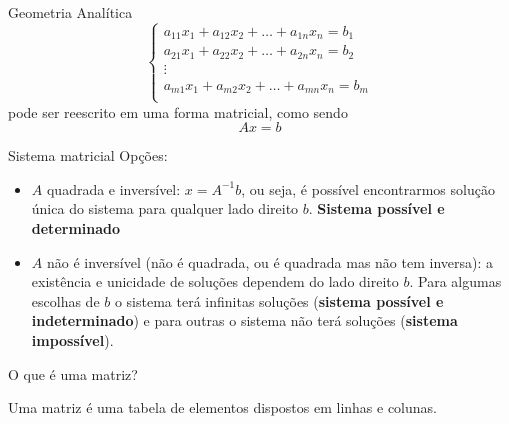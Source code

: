 \documentclass{beamer}
\begin{document}
\begin{darkframes}
\begin{frame}{Geometria Analítica}
\begin{equation*}
  \begin{cases}
 a_{11}x_1+a_{12}x_2+\ldots +a_{1n}x_n=b_1\\
 a_{21}x_1+a_{22}x_2+\ldots +a_{2n}x_n=b_2\\
 \vdots\\
 a_{m1}x_1+a_{m2}x_2+\ldots +a_{mn}x_n=b_m\\
  \end{cases}
\end{equation*}
pode ser reescrito em uma forma matricial, como sendo
\begin{equation*}
  Ax=b
\end{equation*}
\end{frame}

\begin{frame}{Sistema matricial}
Opções:
\begin{itemize}
  \item<2-> $A$ quadrada e inversível: $x=A^{-1}b$, ou seja, é possível encontrarmos solução única do sistema para qualquer lado direito $b$. \textbf{Sistema possível e determinado}
  \item<3-> $A$ não é inversível (não é quadrada, ou é quadrada mas não tem inversa): a existência e unicidade de soluções dependem do lado direito $b$. Para algumas escolhas de $b$ o sistema terá infinitas soluções (\textbf{sistema possível e indeterminado}) e para outras o sistema não terá soluções (\textbf{sistema impossível}). 
\end{itemize}
\end{frame}

\begin{frame}{O que é uma matriz?}
\begin{block}{}
     Uma matriz é uma tabela de elementos dispostos em linhas e colunas.
\end{block}


         

\end{frame}
\end{darkframes}
\end{document}
